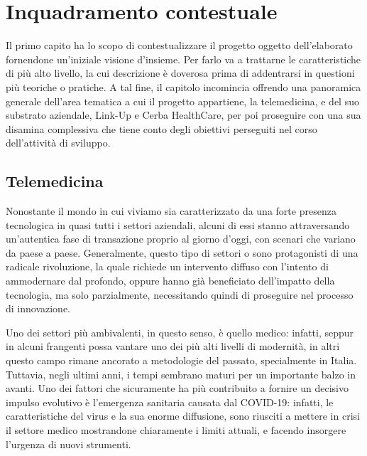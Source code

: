 
\chapter{Inquadramento contestuale}
Il primo capito ha lo scopo di contestualizzare il progetto oggetto dell'elaborato fornendone un'iniziale visione d'insieme. Per farlo va a trattarne le caratteristiche di più alto livello, la cui descrizione è doverosa prima di addentrarsi in questioni più teoriche o pratiche. A tal fine, il capitolo incomincia offrendo una panoramica generale dell'area tematica a cui il progetto appartiene, la telemedicina, e del suo substrato aziendale, Link-Up e Cerba HealthCare, per poi proseguire con una sua disamina complessiva che tiene conto degli obiettivi perseguiti nel corso dell'attività di sviluppo.

\section{Telemedicina}
Nonostante il mondo in cui viviamo sia caratterizzato da una forte presenza tecnologica in quasi tutti i settori aziendali, alcuni di essi stanno attraversando un'autentica fase di transazione proprio al giorno d'oggi, con scenari che variano da paese a paese. Generalmente, questo tipo di settori o sono protagonisti di una radicale rivoluzione, la quale richiede un intervento diffuso con l'intento di ammodernare dal profondo, oppure hanno già beneficiato dell'impatto della tecnologia, ma solo parzialmente, necessitando quindi di proseguire nel processo di innovazione.

Uno dei settori più ambivalenti, in questo senso, è quello medico: infatti, seppur in alcuni frangenti possa vantare uno dei più alti livelli di modernità, in altri questo campo rimane ancorato a metodologie del passato, specialmente in Italia.\\
Tuttavia, negli ultimi anni, i tempi sembrano maturi per un importante balzo in avanti. Uno dei fattori che sicuramente ha più contribuito a fornire un decisivo impulso evolutivo è l'emergenza sanitaria causata dal COVID-19: infatti, le caratteristiche del virus e la sua enorme diffusione,  sono riusciti a mettere in crisi il settore medico mostrandone chiaramente i limiti attuali, e facendo insorgere l'urgenza di nuovi strumenti.

